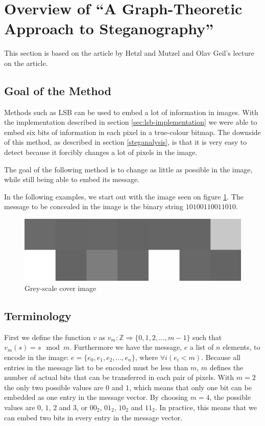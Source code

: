 \clearpage
\section{Overview of ``A Graph-Theoretic Approach to Steganography''}
\label{sec:graphtheory}
{\footnotesize This section is based on the article by Hetzl and Mutzel \citep{hetzl_2005} and Olav Geil's lecture on the article.}

\subsection{Goal of the Method}
Methods such as LSB can be used to embed a lot of information in images. 
With the implementation described in section \ref{sec:lsb-implementation} we were able to embed six bits of information in each pixel in a true-colour bitmap. 
The downside of this method, as described in section \ref{steganalysis}, is that it is very easy to detect because it forcibly changes a lot of pixels in the image. 

The goal of the following method is to change as little as possible in the image, while still being able to embed its message.

In the following examples, we start out with the image seen on figure \ref{fig:startingImage}.
The message to be concealed in the image is the binary string $10100110011010$.

\begin{figure}[h!]
	\centering
	\includegraphics[width=.4\textwidth, frame]{figures/pixelgrid.png}
	\caption{Grey-scale cover image}
	\label{fig:startingImage}
\end{figure}

\subsection{Terminology}
First we define the function $v$ as $ v_m: \mathds{Z} \Rightarrow \{0,1,2,\ldots,m-1\} $ such that $ v_m(s) = s \mod m $. 
Furthermore we have the message, $e$ a list of $n$ elements, to encode in the image: $e = \{ e_0, e_1, e_2, \ldots, e_n \}$, where $\forall i\left( e_i < m \right)$. 
Because all entries in the message list to be encoded must be less than $m$, $m$ defines the number of actual bits that can be transferred in each pair of pixels. With $m = 2$ the only two possible values are $0$ and $1$, which means that only one bit can be embedded as one entry in the message vector.
By choosing $m = 4$, the possible values are $0$, $1$, $2$ and $3$, or $00_2$, $01_2$, $10_2$ and $11_2$.
In practice, this means that we can embed two bits in every entry in the message vector. 

